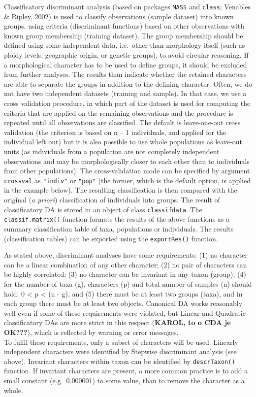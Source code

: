 \documentclass[
]{article}
\begin{document}
Classificatory discriminant analysis (based on packages \texttt{MASS}
and \texttt{class}; Venables \& Ripley, 2002) is used to classify
observations (sample dataset) into known groups, using criteria
(discriminant functions) based on other observations with known group
membership (training dataset). The group membership should be defined
using some independent data, i.e.~other than morphology itself (such as
ploidy levels, geographic origin, or genetic groups), to avoid circular
reasoning. If a morphological character has to be used to define groups,
it should be excluded from further analyses. The results than indicate
whether the retained characters are able to separate the groups in
addition to the defining character. Often, we do not have two
independent datasets (training and sample). In that case, we use a cross
validation procedure, in which part of the dataset is used for computing
the criteria that are applied on the remaining observations and the
procedure is repeated until all observations are classified. The default
is leave-one-out cross validation (the criterion is based on n -- 1
individuals, and applied for the individual left out) but it is also
possible to use whole populations as leave-out units (as individuals
from a population are not completely independent observations and may be
morphologically closer to each other than to individuals from other
populations). The cross-validation mode can be specified by argument
\texttt{crossval} as \texttt{"indiv"} or \texttt{"pop"} (the former,
which is the default option, is applied in the example below). The
resulting classification is then compared with the original (\emph{a
priori}) classification of individuals into groups. The result of
classificatory DA is stored in an object of class \texttt{classifdata}.
The \texttt{classif.matrix()} function formats the results of the above
functions as a summary classification table of taxa, populations or
individuals. The results (classification tables) can be exported using
the \texttt{exportRes()} function.

As stated above, discriminant analyses have some requirements: (1) no
character can be a linear combination of any other character; (2) no
pair of characters can be highly correlated; (3) no character can be
invariant in any taxon (group); (4) for the number of taxa (g),
characters (p) and total number of samples (n) should hold: 0
\textless{} p \textless{} (n - g), and (5) there must be at least two
groups (taxa), and in each group there must be at least two objects.
Canonical DA works reasonably well even if some of these requirements
were violated, but Linear and Quadratic classificatory DAs are more
strict in this respect (\textbf{KAROL, to o CDA je OK???}), which is
reflected by warning or error messages.\\
To fulfil these requirements, only a subset of characters will be used.
Linearly independent characters were identified by Stepwise discriminant
analysis (see above). Invariant characters within taxon can be
identified by \texttt{descrTaxon()} function. If invariant characters
are present, a more common practice is to add a small constant
(e.g.~0.000001) to some value, than to remove the character as a whole.
\end{document}
